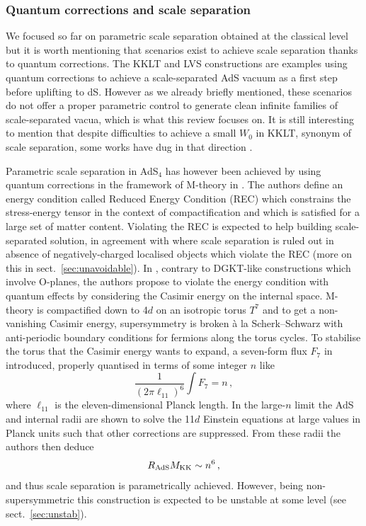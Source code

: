 \documentclass[11pt, a4paper]{article}
\newcommand{\MK}{M_{\rm KK}}
\newcommand{\Rads}{R_{\rm AdS}}
\begin{document}
\subsubsection{Quantum corrections and scale separation}
\label{sec:casimir}

We focused so far on parametric scale separation obtained at the classical level but it is worth mentioning that scenarios exist to achieve scale separation thanks to quantum corrections. The KKLT \cite{Kachru:2003aw} and LVS \cite{Balasubramanian:2005zx} constructions are examples using quantum corrections to achieve a scale-separated AdS vacuum as a first step before uplifting to dS. However as we already briefly mentioned, these scenarios do not offer a proper parametric control to generate clean infinite families of scale-separated vacua, which is what this review focuses on. It is still interesting to mention that despite difficulties to achieve a small $W_0$ in KKLT, synonym of scale separation, some works have dug in that direction \cite{Demirtas:2019sip,Demirtas:2020ffz,Demirtas:2021nlu,Demirtas:2021ote,Grana:2022nyp}.

Parametric scale separation in AdS$_4$ has however been achieved by using quantum corrections in the framework of M-theory in \cite{Luca:2022inb}. The authors define an energy condition called Reduced Energy Condition (REC) \cite{DeLuca:2021mcj} which constrains the stress-energy tensor in the context of compactification and which is satisfied for a large set of matter content. Violating the REC is expected to help building scale-separated solution, in agreement with \cite{Gautason:2015tig} where scale separation is ruled out in absence of negatively-charged localised objects which violate the REC (more on this in sect.~\ref{sec:unavoidable}). In \cite{Luca:2022inb}, contrary to DGKT-like constructions which involve O-planes, the authors propose to violate the energy condition with quantum effects by considering the Casimir energy on the internal space. M-theory is compactified down to 4$d$ on an isotropic torus $T^7$ and to get a non-vanishing Casimir energy, supersymmetry is broken à la Scherk--Schwarz \cite{Scherk:1978ta,Scherk:1979zr,Rohm:1983aq,Kounnas:1988ye,Ferrara:1987es,Ferrara:1988jx,Kounnas:1989dk} with anti-periodic boundary conditions for fermions along the torus cycles. To stabilise the torus that the Casimir energy wants to expand, a seven-form flux $F_7$ in introduced, properly quantised in terms of some integer $n$ like
\begin{equation}
\frac{1}{(2\pi\ell_{11})^6}\int F_7=n\, ,
\end{equation}
%
where $\ell_{11}$ is the eleven-dimensional Planck length. In the large-$n$ limit the AdS and internal radii are shown to solve the 11$d$ Einstein equations at large values in Planck units such that other corrections are suppressed. From these radii the authors then deduce
\begin{equation}
\label{eq:n6}
\Rads\MK\sim n^6\, ,    
\end{equation}
%
and thus scale separation is parametrically achieved. However, being non-supersymmetric this construction is expected to be unstable at some level (see sect.~\ref{sec:unstab}).\\
\end{document}
